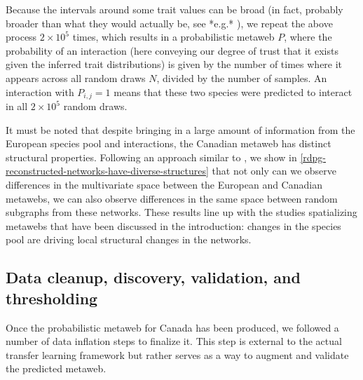 Because the intervals around some trait values can be broad (in fact,
probably broader than what they would actually be, see *e.g.*
\cite{Garland1999IntPhy}), we repeat the above process \(2\times 10^5\)
times, which results in a probabilistic metaweb \(P\), where the
probability of an interaction (here conveying our degree of trust that
it exists given the inferred trait distributions) is given by the number
of times where it appears across all random draws \(N\), divided by the
number of samples. An interaction with \(P_{i,j} = 1\) means that these
two species were predicted to interact in all \(2\times 10^5\) random
draws.

It must be noted that despite bringing in a large amount of information
from the European species pool and interactions, the Canadian metaweb
has distinct structural properties. Following an approach similar to
\cite{Vermaat2009MajDim}, we show in \autoref{rdpg-reconstructed-networks-have-diverse-structures} that not only can we observe
differences in the multivariate space between the European and Canadian
metawebs, we can also observe differences in the same space between
random subgraphs from these networks. These results line up with the
studies spatializing metawebs that have been discussed in the
introduction: changes in the species pool are driving local structural
changes in the networks.

\subsection{Data cleanup, discovery, validation, and
thresholding}\label{data-cleanup-discovery-validation-and-thresholding}

Once the probabilistic metaweb for Canada has been produced, we followed
a number of data inflation steps to finalize it. This step is external
to the actual transfer learning framework but rather serves as a way to
augment and validate the predicted metaweb.

